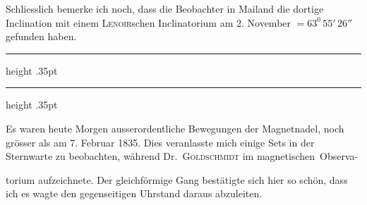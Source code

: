 Schliesslich bemerke ich noch, dass die Beobachter in Mailand die dortige Inclination mit einem \textsc{Lenoir}schen Inclinatorium am 2. November $=63^0\,55'\,26''$ gefunden haben.

\par\vspace{2.9\baselineskip}
\begin{center}
\par
\vspace{.17in}
\begin{minipage}{.724\linewidth}
\centering
\hrule height .35pt
\vspace{1.55mm}
\noindent{}\par
\vspace{1.55mm}
\hrule height .35pt
\end{minipage}
\end{center}
\noindent{}\par
Es waren heute Morgen ausserordentliche Bewegungen der Magnetnadel, noch grösser als am 7. Februar 1835. Dies veranlasste mich einige Sets in der Sternwarte zu beobachten, während Dr.\ \textsc{Goldschmidt} im magnetischen~Observa-
\par\clearpage
{}
\noindent torium aufzeichnete. Der gleichförmige Gang bestätigte sich hier so schön, dass ich es wagte den gegenseitigen Uhrstand daraus abzuleiten.

